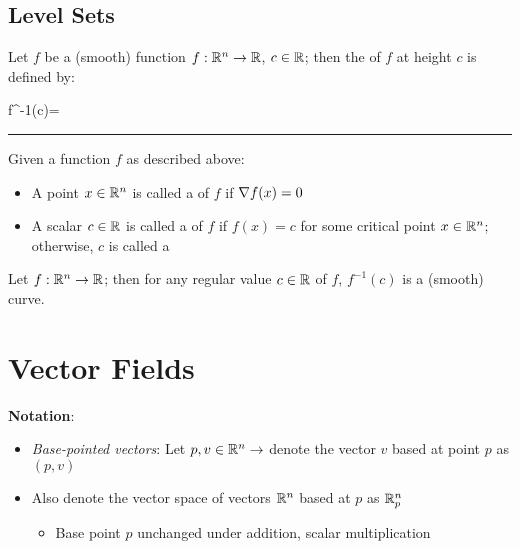 \documentclass[13pt]{extarticle}
\begin{document}
\subsection{Level Sets}
\begin{tcolorbox}[colback=white]
    \begin{definition}
        Let $f$ be a (smooth) function $f:\mathbb{R}^n\to\mathbb{R}$, $c\in\mathbb{R}$; then the  of $f$ at height $c$ is defined by: \begin{eqnbox}
            f^{-1}(c)=
        \end{eqnbox}
    \end{definition}

    \begin{center}
        \vspace{3pt}
        \rule{14cm}{0.4pt}
    \end{center}

    \begin{definition}
        Given a function $f$ as described above: \begin{itemize}
            \item A point $x\in\mathbb{R}^n$ is called a  of $f$ if $\nabla f(x)=0$
            \item A scalar $c\in\mathbb{R}$ is called a  of $f$ if $f(x)=c$ for some critical point $x\in\mathbb{R}^n$; otherwise, $c$ is called a 
        \end{itemize}
    \end{definition}
\end{tcolorbox}

\begin{thm}
    Let $f:\mathbb{R}^n\to\mathbb{R}$; then for any regular value $c\in\mathbb{R}$ of $f$, $f^{-1}(c)$ is a (smooth) curve.
\end{thm}


\pagebreak
\section{Vector Fields}
\textbf{Notation}:
\begin{itemize}
    \item \textit{Base-pointed vectors}: Let $p,v\in\mathbb{R}^n\to$ denote the vector $v$ based at point $p$ as $(p,v)$
    \item Also denote the vector space of vectors $\mathbb{R}^n$ based at $p$ as $\mathbb{R}_p^n$ \begin{itemize}
        \item Base point $p$ unchanged under addition, scalar multiplication
    \end{itemize}
\end{itemize}
\end{document}
